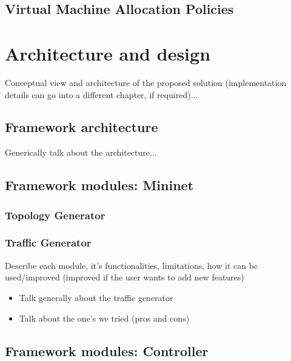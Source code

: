 \documentclass[12pt,english]{book}
\begin{document}
\section{Virtual Machine Allocation Policies}


\chapter{Architecture and design \label{cha:arqdes} }

Conceptual view and architecture of the proposed solution (implementation details can go into a different chapter, if required)...

\section{Framework architecture}

Generically talk about the architecture...


\section{Framework modules: Mininet}

\subsection{Topology Generator}

\subsection{Traffic Generator}

Describe each module, it's functionalities, limitations, how it can be used/improved (improved if the user wants to add new features)

\begin{itemize}
	\item Talk generally about the traffic generator
	\item Talk about the one's we tried (pros and cons)
\end{itemize}

\section{Framework modules: Controller}
\end{document}
